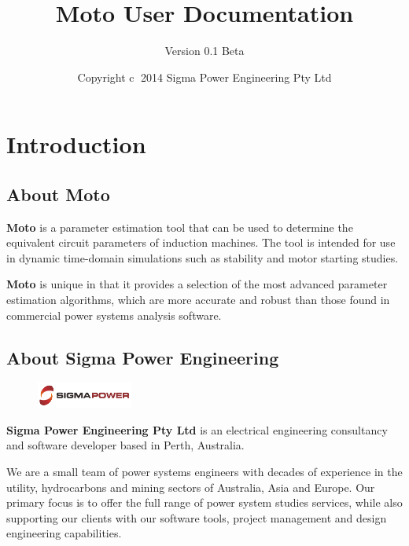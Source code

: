\documentclass{article}
\title{Moto User Documentation}
\author{Version 0.1 Beta}
\date{Copyright \textcircled{c}  2014 Sigma Power Engineering Pty Ltd}
\begin{document}
\pagestyle{plain}
\maketitle

\tableofcontents
\clearpage

\section{Introduction}
\subsection{About Moto}
\textbf{Moto} is a parameter estimation tool that can be used to determine the equivalent circuit parameters of induction machines. The tool is intended for use in dynamic time-domain simulations such as stability and motor starting studies.

\textbf{Moto} is unique in that it provides a selection of the most advanced parameter estimation algorithms, which are more accurate and robust than those found in commercial power systems analysis software.

\subsection{About Sigma Power Engineering}
\begin{figure}[!ht]
    \includegraphics[width=0.28\textwidth]{./Figures/Sigma_Power.png}
\end{figure}


\textbf{Sigma Power Engineering Pty Ltd} is an electrical engineering consultancy and software developer based in Perth, Australia.

We are a small team of power systems engineers with decades of experience in the utility, hydrocarbons and mining sectors of Australia, Asia and Europe. Our primary focus is to offer the full range of power system studies services, while also supporting our clients with our software tools, project management and design engineering capabilities.
\end{document}
